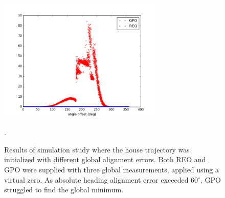 \begin{figure}[H]
  \includegraphics[width=0.7\textwidth]{figures/REO_vs_GPO_global_measurement.png}
  \caption{Results of simulation study where the house trajectory was initialized with different global alignment errors.  Both REO and GPO were supplied with three global measurements, applied using a virtual zero.  As absolute heading alignment error exceeded 60$^\circ$, GPO struggled to find the global minimum.}
  \label{fig:global_heading_error_results}.
\end{figure}

